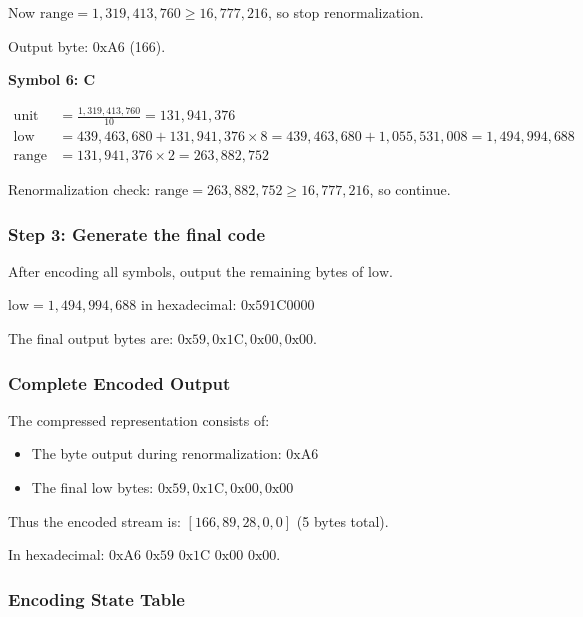 \documentclass[12pt]{article}
\begin{document}
Now $\text{range} = 1{,}319{,}413{,}760 \ge 16{,}777{,}216$, so stop renormalization.

Output byte: $\text{0xA6}$ (166).

\vspace{2mm}
\textbf{Symbol 6: C}

\begin{align*}
\text{unit} &= \frac{1{,}319{,}413{,}760}{10} = 131{,}941{,}376 \\
\text{low} &= 439{,}463{,}680 + 131{,}941{,}376 \times 8 = 439{,}463{,}680 + 1{,}055{,}531{,}008 = 1{,}494{,}994{,}688 \\
\text{range} &= 131{,}941{,}376 \times 2 = 263{,}882{,}752
\end{align*}

Renormalization check: $\text{range} = 263{,}882{,}752 \ge 16{,}777{,}216$, so continue.

\subsubsection*{Step 3: Generate the final code}

After encoding all symbols, output the remaining bytes of $\text{low}$.

$\text{low} = 1{,}494{,}994{,}688$ in hexadecimal: $\text{0x591C0000}$

The final output bytes are: $\text{0x59}, \text{0x1C}, \text{0x00}, \text{0x00}$.

\subsubsection*{Complete Encoded Output}

The compressed representation consists of:
\begin{itemize}
    \item The byte output during renormalization: $\text{0xA6}$
    \item The final $\text{low}$ bytes: $\text{0x59}, \text{0x1C}, \text{0x00}, \text{0x00}$
\end{itemize}

Thus the encoded stream is: $[166, 89, 28, 0, 0]$ (5 bytes total).

In hexadecimal: $\text{0xA6 0x59 0x1C 0x00 0x00}$.

\subsubsection*{Encoding State Table}
\end{document}
